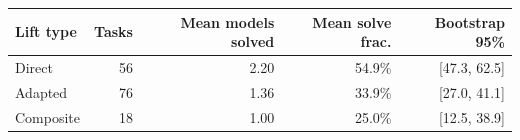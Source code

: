\begin{tabular}{lrrrr}
\toprule
\textbf{Lift type} & \textbf{Tasks} & \textbf{Mean models solved} & \textbf{Mean solve frac.} & \textbf{Bootstrap 95\%} \\
\midrule
Direct & 56 & 2.20 & 54.9\% & [47.3, 62.5] \\
Adapted & 76 & 1.36 & 33.9\% & [27.0, 41.1] \\
Composite & 18 & 1.00 & 25.0\% & [12.5, 38.9] \\
\bottomrule
\end{tabular}
